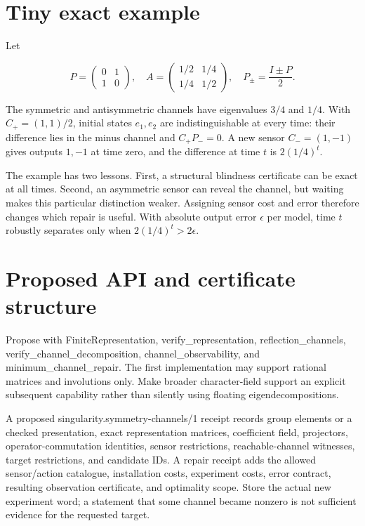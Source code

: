 \documentclass[
  11pt,
  a4paper,
]{report}
\let\nxtexttt\texttt
\renewcommand{\texttt}[1]{\nxtexttt{\seqsplit{#1}}}
\begin{document}
\hypertarget{tiny-exact-example-2}{%
\section{Tiny exact example}\label{tiny-exact-example-2}}

Let

\[
P=\begin{pmatrix}0&1\\1&0\end{pmatrix},\quad
A=\begin{pmatrix}1/2&1/4\\1/4&1/2\end{pmatrix},\quad
P_\pm=\frac{I\pm P}{2}.
\]

The symmetric and antisymmetric channels have eigenvalues \(3/4\) and
\(1/4\). With \(C_+=(1,1)/2\), initial states \(e_1,e_2\) are
indistinguishable at every time: their difference lies in the minus
channel and \(C_+P_-=0\). A new sensor \(C_-=(1,-1)\) gives outputs
\(1,-1\) at time zero, and the difference at time \(t\) is \(2(1/4)^t\).

The example has two lessons. First, a structural blindness certificate
can be exact at all times. Second, an asymmetric sensor can reveal the
channel, but waiting makes this particular distinction weaker. Assigning
sensor cost and error therefore changes which repair is useful. With
absolute output error \(\epsilon\) per model, time \(t\) robustly
separates only when \(2(1/4)^t>2\epsilon\).

\hypertarget{proposed-api-and-certificate-structure}{%
\section{Proposed API and certificate
structure}\label{proposed-api-and-certificate-structure}}

Propose \texttt{src/singularity/symmetry\_channels.py} with
FiniteRepresentation, verify\_representation, reflection\_channels,
verify\_channel\_decomposition, channel\_observability, and
minimum\_channel\_repair. The first implementation may support rational
matrices and involutions only. Make broader character-field support an
explicit subsequent capability rather than silently using floating
eigendecompositions.

A proposed singularity.symmetry-channels/1 receipt records group
elements or a checked presentation, exact representation matrices,
coefficient field, projectors, operator-commutation identities, sensor
restrictions, reachable-channel witnesses, target restrictions, and
candidate IDs. A repair receipt adds the allowed sensor/action
catalogue, installation costs, experiment costs, error contract,
resulting observation certificate, and optimality scope. Store the
actual new experiment word; a statement that some channel became nonzero
is not sufficient evidence for the requested target.
\end{document}
